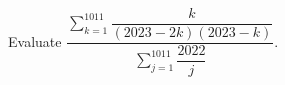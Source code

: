 Evaluate $\displaystyle\dfrac{\sum_{k=1}^{1011}\dfrac{k}{(2023-2k)(2023-k)}}{\sum_{j=1}^{1011}\dfrac{2022}{j}}$.
